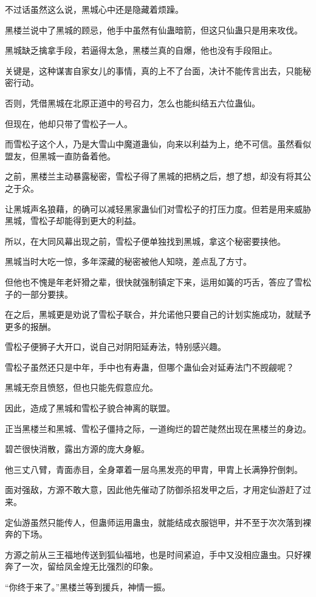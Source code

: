 \begin{this_body}
不过话虽然这么说，黑城心中还是隐藏着烦躁。

黑楼兰说中了黑城的顾忌，他手中虽然有仙蛊暗箭，但这只仙蛊只是用来攻伐。

黑城缺乏擒拿手段，若逼得太急，黑楼兰真的自爆，他也没有手段阻止。

关键是，这种谋害自家女儿的事情，真的上不了台面，决计不能传言出去，只能秘密行动。

否则，凭借黑城在北原正道中的号召力，怎么也能纠结五六位蛊仙。

但现在，他却只带了雪松子一人。

而雪松子这个人，乃是大雪山中魔道蛊仙，向来以利益为上，绝不可信。虽然看似盟友，但黑城一直防备着他。

之前，黑楼兰主动暴露秘密，雪松子得了黑城的把柄之后，想了想，却没有将其公之于众。

让黑城声名狼藉，的确可以减轻黑家蛊仙们对雪松子的打压力度。但若是用来威胁黑城，雪松子却能得到更大的利益。

所以，在大同风幕出现之前，雪松子便单独找到黑城，拿这个秘密要挟他。

黑城当时大吃一惊，多年深藏的秘密被他人知晓，差点乱了方寸。

但他也不愧是年老奸猾之辈，很快就强制镇定下来，运用如簧的巧舌，答应了雪松子的一部分要挟。

在之后，黑城更是劝说了雪松子联合，并允诺他只要自己的计划实施成功，就赋予更多的报酬。

雪松子便狮子大开口，说自己对阴阳延寿法，特别感兴趣。

雪松子虽然还只是中年，手中也有寿蛊，但哪个蛊仙会对延寿法门不觊觎呢？

黑城无奈且愤怒，但也只能先假意应允。

因此，造成了黑城和雪松子貌合神离的联盟。

正当黑楼兰和黑城、雪松子僵持之际，一道绚烂的碧芒陡然出现在黑楼兰的身边。

碧芒很快消散，露出方源的庞大身躯。

他三丈八臂，青面赤目，全身罩着一层乌黑发亮的甲胄，甲胄上长满狰狞倒刺。

面对强敌，方源不敢大意，因此他先催动了防御杀招发甲之后，才用定仙游赶了过来。

定仙游虽然只能传人，但蛊师运用蛊虫，就能结成衣服铠甲，并不至于次次落到裸奔的下场。

方源之前从三王福地传送到狐仙福地，也是时间紧迫，手中又没相应蛊虫。只好裸奔了一次，留给凤金煌无比强烈的印象。

“你终于来了。”黑楼兰等到援兵，神情一振。


\end{this_body}
